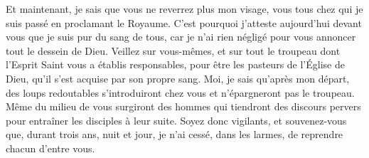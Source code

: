 Et maintenant, je sais que vous ne reverrez plus mon visage,
	vous tous chez qui je suis passé en proclamant le Royaume.
C’est pourquoi j’atteste aujourd’hui devant vous
		que je suis pur du sang de tous,
	car je n’ai rien négligé pour vous annoncer tout le dessein de Dieu.
Veillez sur vous-mêmes,
	et sur tout le troupeau dont l’Esprit Saint vous a établis responsables,
	pour être les pasteurs de l’Église de Dieu,
	qu’il s’est acquise par son propre sang.
Moi, je sais qu’après mon départ,
	des loups redoutables s’introduiront chez vous
	et n’épargneront pas le troupeau.
Même du milieu de vous surgiront des hommes qui tiendront des discours pervers
	pour entraîner les disciples à leur suite.
Soyez donc vigilants, et souvenez-vous que, durant trois ans, nuit et jour,
	je n’ai cessé, dans les larmes, de reprendre chacun d’entre vous.
